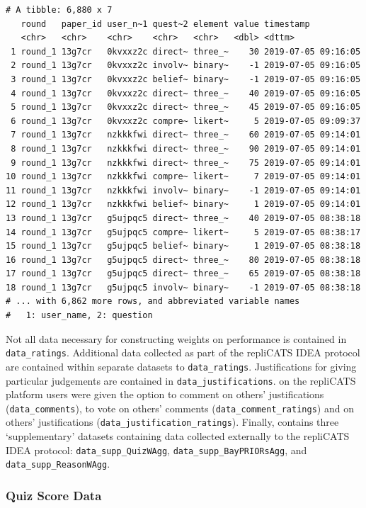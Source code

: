 \documentclass[article]{jss}
\begin{document}
\begin{verbatim}
# A tibble: 6,880 x 7
   round   paper_id user_n~1 quest~2 element value timestamp          
   <chr>   <chr>    <chr>    <chr>   <chr>   <dbl> <dttm>             
 1 round_1 13g7cr   0kvxxz2c direct~ three_~    30 2019-07-05 09:16:05
 2 round_1 13g7cr   0kvxxz2c involv~ binary~    -1 2019-07-05 09:16:05
 3 round_1 13g7cr   0kvxxz2c belief~ binary~    -1 2019-07-05 09:16:05
 4 round_1 13g7cr   0kvxxz2c direct~ three_~    40 2019-07-05 09:16:05
 5 round_1 13g7cr   0kvxxz2c direct~ three_~    45 2019-07-05 09:16:05
 6 round_1 13g7cr   0kvxxz2c compre~ likert~     5 2019-07-05 09:09:37
 7 round_1 13g7cr   nzkkkfwi direct~ three_~    60 2019-07-05 09:14:01
 8 round_1 13g7cr   nzkkkfwi direct~ three_~    90 2019-07-05 09:14:01
 9 round_1 13g7cr   nzkkkfwi direct~ three_~    75 2019-07-05 09:14:01
10 round_1 13g7cr   nzkkkfwi compre~ likert~     7 2019-07-05 09:14:01
11 round_1 13g7cr   nzkkkfwi involv~ binary~    -1 2019-07-05 09:14:01
12 round_1 13g7cr   nzkkkfwi belief~ binary~     1 2019-07-05 09:14:01
13 round_1 13g7cr   g5ujpqc5 direct~ three_~    40 2019-07-05 08:38:18
14 round_1 13g7cr   g5ujpqc5 compre~ likert~     5 2019-07-05 08:38:17
15 round_1 13g7cr   g5ujpqc5 belief~ binary~     1 2019-07-05 08:38:18
16 round_1 13g7cr   g5ujpqc5 direct~ three_~    80 2019-07-05 08:38:18
17 round_1 13g7cr   g5ujpqc5 direct~ three_~    65 2019-07-05 08:38:18
18 round_1 13g7cr   g5ujpqc5 involv~ binary~    -1 2019-07-05 08:38:18
# ... with 6,862 more rows, and abbreviated variable names
#   1: user_name, 2: question
\end{verbatim}

Not all data necessary for constructing weights on performance is
contained in \texttt{data\_ratings}. Additional data collected as part
of the repliCATS IDEA protocol are contained within separate datasets to
\texttt{data\_ratings}. Justifications for giving particular judgements
are contained in \texttt{data\_justifications}. on the repliCATS
platform users were given the option to comment on others'
justifications (\texttt{data\_comments}), to vote on others' comments
(\texttt{data\_comment\_ratings}) and on others' justifications
(\texttt{data\_justification\_ratings}). Finally, 
contains three `supplementary' datasets containing data collected
externally to the repliCATS IDEA protocol:
\texttt{data\_supp\_QuizWAgg}, \texttt{data\_supp\_BayPRIORsAgg}, and
\texttt{data\_supp\_ReasonWAgg}.

\hypertarget{sec-quiz-supplementary-data}{%
\subsubsection{Quiz Score Data}\label{sec-quiz-supplementary-data}}
\end{document}
